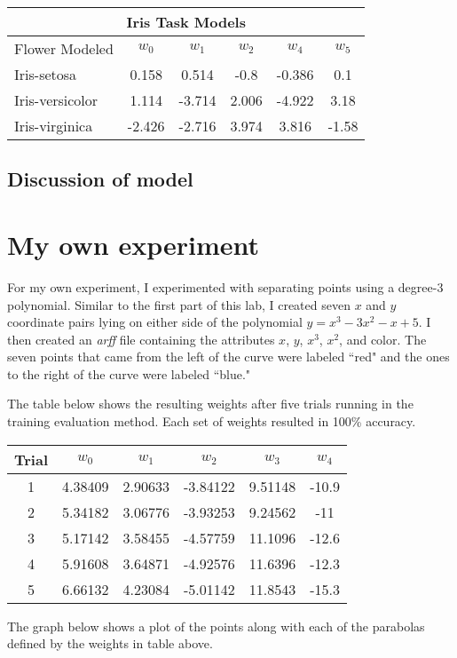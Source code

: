 \documentclass[12pt,letterpaper]{article}
\begin{document}
\begin{center}
\begin{tabular}{lccccc}
\toprule
\multicolumn{6}{c}{Iris Task Models} \\
\hline
Flower Modeled	&	$w_0$	&	$w_1$	&	$w_2$	&	$w_4$	&	$w_5$\\
\hline
Iris-setosa	&	0.158	&	0.514	&	-0.8	&	-0.386	&	0.1\\
Iris-versicolor	&	1.114	&	-3.714	&	2.006	&	-4.922	&	3.18\\
Iris-virginica	&	-2.426	&	-2.716	&	3.974	&	3.816	&	-1.58\\
\bottomrule
\end{tabular}
\end{center}

\subsection*{Discussion of model}

\section*{My own experiment}

For my own experiment, I experimented with separating points using a degree-3 polynomial. Similar to the first part of this lab, I created seven $x$ and $y$ coordinate pairs lying on either side of the polynomial $y = x^3 - 3x^2 - x + 5$. I then created an \emph{arff} file containing the attributes $x$, $y$, $x^3$, $x^2$, and color. The seven points that came from the left of the curve were labeled ``red" and the ones to the right of the curve were labeled ``blue."

The table below shows the resulting weights after five trials running in the training evaluation method. Each set of weights resulted in 100\% accuracy.

\begin{center}
\begin{tabular}{cccccc}
\toprule
Trial & $w_0$ & $w_1$ & $w_2$ & $w_3$ & $w_4$ \\
\hline
1 & 4.38409	&	2.90633	&	-3.84122	&	9.51148	&	-10.9\\
2 & 5.34182	&	3.06776	&	-3.93253	&	9.24562	&	-11\\
3 & 5.17142	&	3.58455	&	-4.57759	&	11.1096	&	-12.6\\
4 & 5.91608	&	3.64871	&	-4.92576	&	11.6396	&	-12.3\\
5 & 6.66132	&	4.23084	&	-5.01142	&	11.8543	&	-15.3\\
\bottomrule
\end{tabular}
\end{center}


The graph below shows a plot of the points along with each of the parabolas defined by the weights in table above. 
\end{document}

